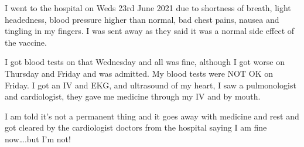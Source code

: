 I went to the hospital on Weds 23rd June 2021 due to shortness of breath, light
headedness, blood pressure higher than normal, bad chest pains, nausea and
tingling in my fingers. I was sent away as they said it was a normal side effect
of the vaccine.

I got blood tests on that Wednesday and all was fine, although I got worse on
Thursday and Friday and was admitted. My blood tests were NOT OK on Friday. I
got an IV and EKG, and ultrasound of my heart, I saw a pulmonologist and
cardiologist, they gave me medicine through my IV and by mouth.

I am told it’s not a permanent thing and it goes away with medicine and rest and
got cleared by the cardiologist doctors from the hospital saying I am fine
now….but I’m not!

